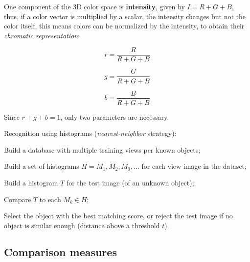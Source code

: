 \begin{obs}
    One component of the 3D color space is \textbf{intensity}, given by $I = R + G + B$, thus, if a color vector is multiplied by a scalar, the intensity changes but not the color itself, this means colors can be normalized by the intensity, to obtain their \textit{chromatic representation}:\\
    \begin{minipage}{.33\linewidth}
        \begin{equation}\label{eq:chromatic-r}
        r = \frac{R}{R+ G + B}
        \end{equation}
    \end{minipage}
    \begin{minipage}{.33\linewidth}
        \begin{equation}\label{eq:chromatic-g}
        g = \frac{G}{R+ G + B}
        \end{equation}
    \end{minipage}
    \begin{minipage}{.33\linewidth}
        \begin{equation}\label{eq:chromatic-b}
        b = \frac{B}{R+ G + B}
        \end{equation}
    \end{minipage}
\end{obs}

\obs Since $r + g + b = 1$, only two parameters are necessary.

Recognition using histograms (\textit{nearest-neighbor} strategy):
\begin{myenum}
    \item Build a database with multiple training views per known objects;
    \item Build a set of histograms $H = {M_1, M_2, M_3, \ldots}$ for each view image in the dataset;
    \item Build a histogram $T$ for the test image (of an unknown object);
    \item Compare $T$ to each $M_k \in H$;
    \item Select the object with the best matching score, or reject the test image if no object is similar enough (distance above a threshold $t$).
\end{myenum}


\subsection{Comparison measures}\label{sec:h-measures}

